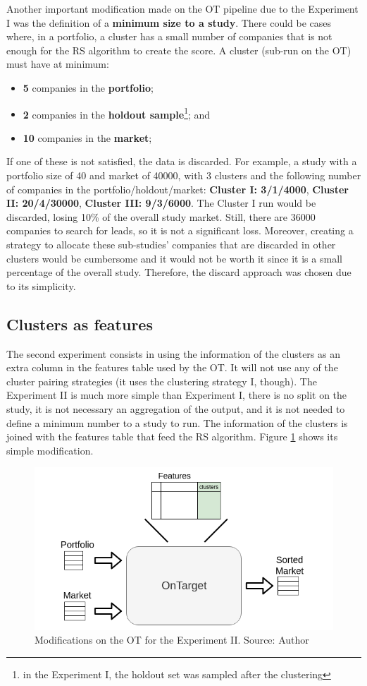 Another important modification made on the OT pipeline due to the Experiment I was the definition of a \textbf{minimum size to a study}. There could be cases where, in a portfolio, a cluster has a small number of companies that is not enough for the RS algorithm to create the score. A cluster (sub-run on the OT) must have at minimum:
\begin{itemize}
    \item \textbf{5} companies in the \textbf{portfolio};
    \item \textbf{2} companies in the \textbf{holdout sample}\footnote{in the Experiment I, the holdout set was sampled after the clustering}; and
    \item \textbf{10} companies in the \textbf{market};
\end{itemize}
If one of these is not satisfied, the data is discarded. For example, a study with a portfolio size of 40 and market of 40000, with 3 clusters and the following number of companies in the portfolio/holdout/market: \textbf{Cluster I: 3/1/4000}, \textbf{Cluster II: 20/4/30000}, \textbf{Cluster III: 9/3/6000}. The Cluster I run would be discarded, losing 10\% of the overall study market. Still, there are 36000 companies to search for leads, so it is not a significant loss. Moreover, creating a strategy to allocate these sub-studies' companies that are discarded in other clusters would be cumbersome and it would not be worth it since it is a small percentage of the overall study. Therefore, the discard approach was chosen due to its simplicity.

\subsection{Clusters as features}

The second experiment consists in using the information of the clusters as an extra column in the features table used by the OT. It will not use any of the cluster pairing strategies (it uses the clustering strategy I, though). The Experiment II is much more simple than Experiment I, there is no split on the study, it is not necessary an aggregation of the output, and it is not needed to define a minimum number to a study to run. The information of the clusters is joined with the features table that feed the RS algorithm. Figure \ref{fig:clusters-as-features} shows its simple modification.

\begin{figure}[H]
   \centering
   \includegraphics[width=\linewidth]{fig/ch3-clusters-as-features.png}
   \caption{Modifications on the OT for the Experiment II. Source: Author}
   \label{fig:clusters-as-features}
\end{figure}
